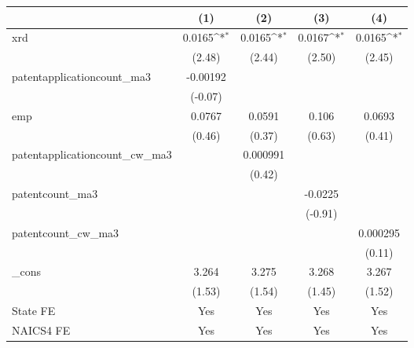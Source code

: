 {
\def\sym#1{\ifmmode^{#1}\else\(^{#1}\)\fi}
\begin{tabular}{l*{4}{c}}
\hline\hline
            &\multicolumn{1}{c}{(1)}         &\multicolumn{1}{c}{(2)}         &\multicolumn{1}{c}{(3)}         &\multicolumn{1}{c}{(4)}         \\
\hline
xrd         &      0.0165\sym{*}  &      0.0165\sym{*}  &      0.0167\sym{*}  &      0.0165\sym{*}  \\
            &      (2.48)         &      (2.44)         &      (2.50)         &      (2.45)         \\
[1em]
patentapplicationcount\_ma3&    -0.00192         &                     &                     &                     \\
            &     (-0.07)         &                     &                     &                     \\
[1em]
emp         &      0.0767         &      0.0591         &       0.106         &      0.0693         \\
            &      (0.46)         &      (0.37)         &      (0.63)         &      (0.41)         \\
[1em]
patentapplicationcount\_cw\_ma3&                     &    0.000991         &                     &                     \\
            &                     &      (0.42)         &                     &                     \\
[1em]
patentcount\_ma3&                     &                     &     -0.0225         &                     \\
            &                     &                     &     (-0.91)         &                     \\
[1em]
patentcount\_cw\_ma3&                     &                     &                     &    0.000295         \\
            &                     &                     &                     &      (0.11)         \\
[1em]
\_cons      &       3.264         &       3.275         &       3.268         &       3.267         \\
            &      (1.53)         &      (1.54)         &      (1.45)         &      (1.52)         \\
[1em]
State FE    &         Yes         &         Yes         &         Yes         &         Yes         \\
[1em]
NAICS4 FE   &         Yes         &         Yes         &         Yes         &         Yes         \\

\end{tabular}}
